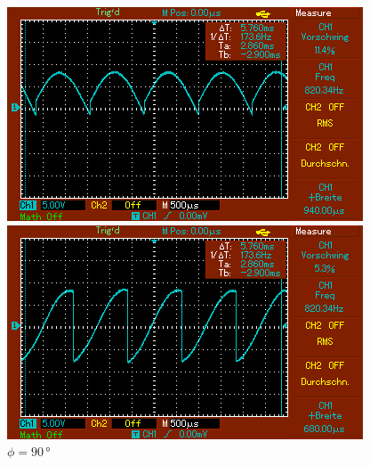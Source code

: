 \begin{figure}
    \begin{minipage}[b]{.45\linewidth} %
       \includegraphics[width=\linewidth]{bilder/MAP005.png}
       \caption{$\phi = 60\,\unit{°}$}
    \end{minipage}
    \hspace{0.1\linewidth}%
    \begin{minipage}[b]{.45\linewidth} %
       \includegraphics[width=\linewidth]{bilder/MAP006.png}
       \caption{$\phi = 90\,\unit{°}$}
    \end{minipage}
\end{figure}

